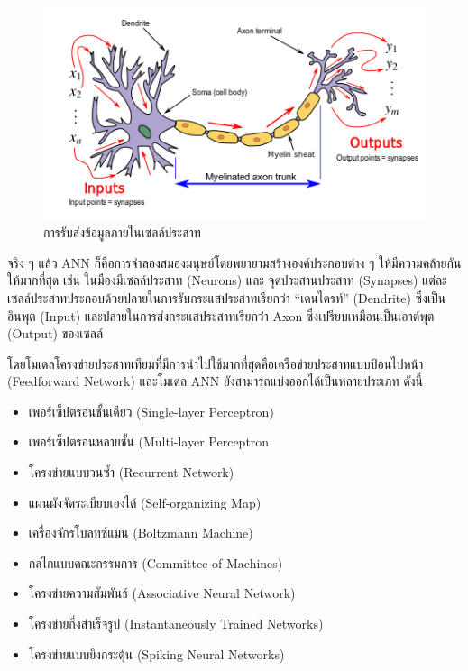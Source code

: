 \begin{figure}[H]
    \centering
    \includegraphics[width=0.9\linewidth]{fig/neuron.png}
    \caption{การรับส่งข้อมูลภายในเซลล์ประสาท}
    \label{fig:neuron}
\end{figure}

จริง ๆ แล้ว ANN ก็คือการจำลองสมองมนุษย์โดยพยายามสร้างองค์ประกอบต่าง ๆ ให้มีความคล้ายกันให้มากที่สุด เช่น ในมืองมีเซลล์ประสาท (Neurons) 
และ จุดประสานประสาท (Synapses) แต่ละเซลล์ประสาทประกอบด้วยปลายในการรับกระแสประสาทเรียกว่า \enquote{เดนไดรท์} (Dendrite) 
ซึ่งเป็นอินพุต (Input) และปลายในการส่งกระแสประสาทเรียกว่า Axon ซึ่งเปรียบเหมือนเป็นเอาต์พุต (Output) ของเซลล์

โดยโมเดลโครงข่ายประสาทเทียมที่มีการนำไปใช้มากที่สุดคือเครือข่ายประสาทแบบป้อนไปหน้า (Feedforward Network) และโมเดล ANN 
ยังสามารถแบ่งออกได้เป็นหลายประเภท ดังนี้

\begin{itemize}
    \item เพอร์เซ็ปตรอนชั้นเดียว (Single-layer Perceptron)
    \item เพอร์เซ็ปตรอนหลายชั้น (Multi-layer Perceptron
    \item โครงข่ายแบบวนซ้ำ (Recurrent Network)
    \item แผนผังจัดระเบียบเองได้ (Self-organizing Map)
    \item เครื่องจักรโบลทซ์แมน (Boltzmann Machine)
    \item กลไกแบบคณะกรรมการ (Committee of Machines)
    \item โครงข่ายความสัมพันธ์ (Associative Neural Network)
    \item โครงข่ายกึ่งสำเร็จรูป (Instantaneously Trained Networks)
    \item โครงข่ายแบบยิงกระตุ้น (Spiking Neural Networks) 
\end{itemize}
